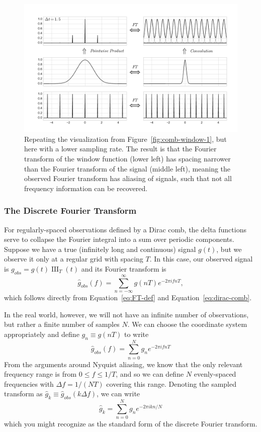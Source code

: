 \documentclass[preprint]{aastex}
\DeclareMathOperator{\III}{III}
\newcommand{\fig}[1]{Figure~\ref{fig:#1}}
\newcommand{\figlabel}[1]{\label{fig:#1}}
\newcommand{\Eq}[1]{Equation~\ref{eq:#1}}
\newcommand{\eq}[1]{\Eq{#1}}
\newcommand{\eqlabel}[1]{\label{eq:#1}}
\begin{document}
\begin{figure}[ht]
  \centering
  \includegraphics[width=\textwidth]{fig08_comb_window_2}
  \caption{Repeating the visualization from \fig{comb-window-1}, but here with
    a lower sampling rate. The result is that the Fourier transform of the
    window function (lower left) has spacing narrower than the Fourier transform
    of the signal (middle left), meaning the observed Fourier transform has
    aliasing of signals, such that not all frequency information can be
    recovered.
    \figlabel{comb-window-2}}
\end{figure}

\subsubsection{The Discrete Fourier Transform}
For regularly-spaced observations defined by a Dirac comb, the delta functions
serve to collapse the Fourier integral into a sum over periodic components.
Suppose we have a true (infinitely long and continuous) signal $g(t)$, but
we observe it only at a regular grid with spacing $T$. In this case, our
observed signal is $g_{obs} = g(t) \III_T(t)$ and its Fourier transform is
\begin{equation}
  \hat{g}_{obs}(f) = \sum_{n=-\infty}^\infty g(nT) e^{-2\pi i f n T},
\end{equation}
which follows directly from \eq{FT-def} and \eq{dirac-comb}.

In the real world, however, we will not have an infinite number of observations,
but rather a finite number of samples $N$.
We can choose the coordinate system appropriately and define
$g_n \equiv g(nT)$ to write
\begin{equation}
  \hat{g}_{obs}(f) = \sum_{n=0}^N g_n e^{-2\pi i f n T}
  \eqlabel{DFT-f}
\end{equation}
From the arguments around Nyquist aliasing, we know that the only relevant
frequency range is from $0 \le f \le 1/T$, and so we can define $N$
evenly-spaced frequencies with $\Delta f = 1 / (NT)$ covering this range.
Denoting the sampled transform as
$\hat{g}_k \equiv \hat{g}_{obs}(k\Delta f)$, we can write
\begin{equation}
  \hat{g}_k = \sum_{n=0}^N g_n e^{-2\pi i k n / N}
  \eqlabel{DFT}
\end{equation}
which you might recognize as the standard form of the discrete Fourier
transform.
\end{document}
